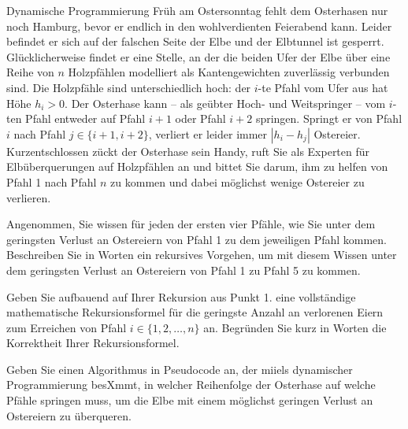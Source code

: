 \documentclass{article}
\begin{document}
\begin{eexercises}{Dynamische Programmierung}{
    Früh am Ostersonntag fehlt dem Osterhasen nur noch Hamburg, bevor er endlich in den wohlverdienten Feierabend kann. Leider befindet er sich auf der falschen Seite der Elbe und der Elbtunnel ist gesperrt. Glücklicherweise findet er eine Stelle, an der die beiden Ufer der Elbe über eine Reihe von $n$ Holzpfählen modelliert als Kantengewichten zuverlässig verbunden sind. Die Holzpfähle sind unterschiedlich hoch: der $i$-te Pfahl vom Ufer aus hat Höhe $h_i > 0$. Der Osterhase kann – als geübter Hoch- und Weitspringer – vom $i$-ten Pfahl entweder auf Pfahl $i+1$ oder Pfahl $i+2$ springen. Springt er von Pfahl $i$ nach Pfahl $j \in \{i + 1, i + 2\}$, verliert er leider immer $|h_i - h_j|$ Ostereier. Kurzentschlossen zückt der Osterhase sein Handy, ruft Sie als Experten für Elbüberquerungen auf Holzpfählen an und bittet Sie darum, ihm zu helfen von Pfahl 1 nach Pfahl $n$ zu kommen und dabei möglichst wenige Ostereier zu verlieren.
  }
  \item Angenommen, Sie wissen für jeden der ersten vier Pfähle, wie Sie unter dem geringsten Verlust an Ostereiern von Pfahl 1 zu dem jeweiligen Pfahl kommen. Beschreiben Sie in Worten ein rekursives Vorgehen, um mit diesem Wissen unter dem geringsten Verlust an Ostereiern von Pfahl 1 zu Pfahl 5 zu kommen.
  \item Geben Sie aufbauend auf Ihrer Rekursion aus Punkt 1. eine vollständige mathematische Rekursionsformel für die geringste Anzahl an verlorenen Eiern zum Erreichen von Pfahl $i \in \{1, 2, \ldots, n\}$ an. Begründen Sie kurz in Worten die Korrektheit Ihrer Rekursionsformel.
  \item Geben Sie einen Algorithmus in Pseudocode an, der miiels dynamischer Programmierung besXmmt, in welcher Reihenfolge der Osterhase auf welche Pfähle springen muss, um die Elbe mit einem möglichst geringen Verlust an Ostereiern zu überqueren.
\end{eexercises}
\end{document}
